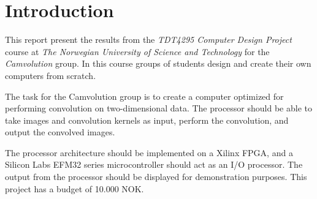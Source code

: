 \chapter{Introduction}
This report present the results from the \textit{TDT4295 Computer Design Project} course at \textit{The Norwegian University of Science and Technology} for the \textit{Camvolution} group.
In this course groups of students design and create their own computers from scratch.

The task for the Camvolution group is to create a computer optimized for performing convolution on two-dimensional data.
The processor should be able to take images and convolution kernels as input, perform the convolution, and output the convolved images.

The processor architecture should be implemented on a Xilinx FPGA, and a Silicon Labs EFM32 series microcontroller should act as an I/O processor.
The output from the processor should be displayed for demonstration purposes.
This project has a budget of 10.000 NOK.




